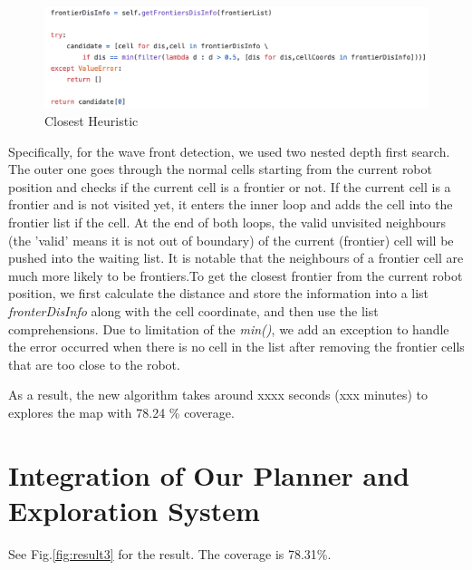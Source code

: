 \documentclass{article}
\begin{document}
\begin{figure}[ht]
\centering
\includegraphics[scale=0.5]{graphs/part2-3/closest.png}
\caption{Closest Heuristic}
\label{fig:closestHeuristic}
\end{figure}

Specifically, for the wave front detection, we used two nested depth first search. The outer one goes through the normal cells starting from the current robot position and checks if the current cell is a frontier or not. If the current cell is a frontier and is not visited yet, it enters the inner loop and adds the cell into the frontier list if the cell. At the end of both loops, the valid unvisited neighbours (the 'valid' means it is not out of boundary) of the current (frontier) cell will be pushed into the waiting list. It is notable that the neighbours of a frontier cell are much more likely to be frontiers.To get the closest frontier from the current robot position, we first calculate the distance and store the information into a list \textit{fronterDisInfo} along with the cell coordinate, and then use the list comprehensions. Due to limitation of the \textit{min()}, we add an exception to handle the error occurred when there is no cell in the list after removing the frontier cells that are too close to the robot. 

As a result, the new algorithm takes around xxxx seconds (xxx minutes) to explores the map with 78.24 \% coverage. 

\section{Integration of Our Planner and Exploration System}

See Fig.\ref{fig:result3} for the result. The coverage is  78.31\%.
\end{document}
